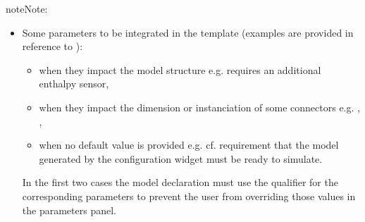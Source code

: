 \documentclass[letterpaper,10pt, openany,english]{sphinxmanual}
\begin{document}
\begin{sphinxadmonition}{note}{Note:}
\begin{itemize}
\begin{itemize}
\item {} 
Some parameters  to be integrated in the template (examples are provided in reference to ):
\begin{itemize}
\item {} 
when they impact the model structure e.g.  requires an additional enthalpy sensor,

\item {} 
when they impact the dimension or instanciation of some connectors e.g. , ,

\item {} 
when no default value is provided e.g.  cf. requirement that the model generated by the configuration widget must be ready to simulate.

\end{itemize}

In the first two cases the model declaration must use the  qualifier for the corresponding parameters to prevent the user from overriding those values in the parameters panel.

\end{itemize}

\end{itemize}
\end{sphinxadmonition}
\end{document}
